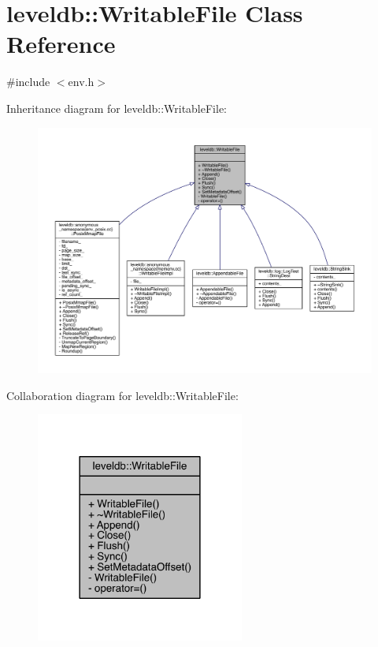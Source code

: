 \hypertarget{classleveldb_1_1_writable_file}{}\section{leveldb\+:\+:Writable\+File Class Reference}
\label{classleveldb_1_1_writable_file}


{\ttfamily \#include $<$env.\+h$>$}



Inheritance diagram for leveldb\+:\+:Writable\+File\+:
\nopagebreak
\begin{figure}[H]
\begin{center}
\leavevmode
\includegraphics[width=350pt]{classleveldb_1_1_writable_file__inherit__graph}
\end{center}
\end{figure}


Collaboration diagram for leveldb\+:\+:Writable\+File\+:\nopagebreak
\begin{figure}[H]
\begin{center}
\leavevmode
\includegraphics[width=194pt]{classleveldb_1_1_writable_file__coll__graph}
\end{center}
\end{figure}
